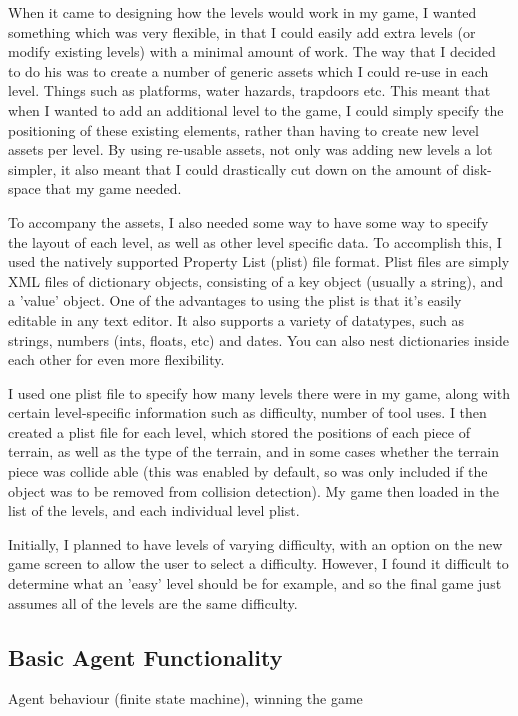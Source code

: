 \documentclass[a4paper,oneside]{report}
\begin{document}
When it came to designing how the levels would work in my game, I wanted something which was very flexible, in that I could easily add extra levels (or modify existing levels) with a minimal amount of work. The way that I decided to do his was to create a number of generic assets which I could re-use in each level. Things such as platforms, water hazards, trapdoors etc. This meant that when I wanted to add an additional level to the game, I could simply specify the positioning of these existing elements, rather than having to create new level assets per level. By using re-usable assets, not only was adding new levels a lot simpler, it also meant that I could drastically cut down on the amount of disk-space that my game needed.

To accompany the assets, I also needed some way to have some way to specify the layout of each level, as well as other level specific data. To accomplish this, I used the natively supported Property List (plist) file format. Plist files are simply XML files of dictionary objects, consisting of a key object (usually a string), and a 'value' object. One of the advantages to using the plist is that it's easily editable in any text editor. It also supports a variety of datatypes, such as strings, numbers (ints, floats, etc) and dates. You can also nest dictionaries inside each other for even more flexibility. 

I used one plist file to specify how many levels there were in my game, along with certain level-specific information such as difficulty, number of tool uses. I then created a plist file for each level, which stored the positions of each piece of terrain, as well as the type of the terrain, and in some cases whether the terrain piece was collide able (this was enabled by default, so was only included if the object was to be removed from collision detection). My game then loaded in the list of the levels, and each individual level plist. 

Initially, I planned to have levels of varying difficulty, with an option on the new game screen to allow the user to select a difficulty. However, I found it difficult to determine what an 'easy' level should be for example, and so the final game just assumes all of the levels are the same difficulty.

\subsection{Basic Agent Functionality} Agent behaviour (finite state machine), winning the game
\end{document}
